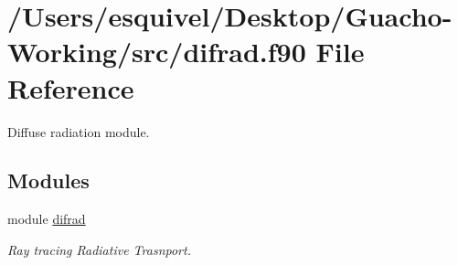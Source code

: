 \hypertarget{difrad_8f90}{}\section{/\+Users/esquivel/\+Desktop/\+Guacho-\/\+Working/src/difrad.f90 File Reference}
\label{difrad_8f90}


Diffuse radiation module.  


\subsection*{Modules}
\begin{DoxyCompactItemize}
\item 
module \hyperlink{namespacedifrad}{difrad}
\begin{DoxyCompactList}\small\item\em Ray tracing Radiative Trasnport. \end{DoxyCompactList}\end{DoxyCompactItemize}
